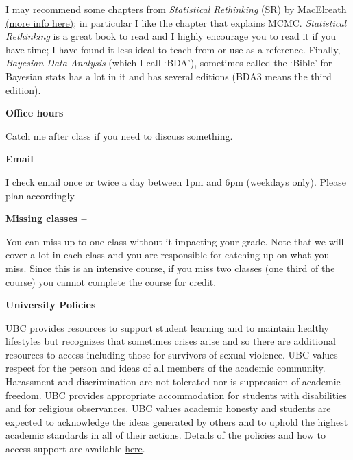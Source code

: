 \documentclass[11pt]{article}
\begin{document}
\noindent I may recommend some chapters from \emph{Statistical Rethinking} (SR) by MacElreath \href{http://xcelab.net/rm/statistical-rethinking/}{(more info here)}; in particular I like the chapter that explains MCMC. \emph{Statistical Rethinking} is a great book to read and I highly encourage you to read it if you have time; I have found it less ideal to teach from or use as a reference. Finally, \emph{Bayesian Data Analysis} (which I call `BDA'), sometimes called the `Bible' for Bayesian stats has a lot in it and has several editions (BDA3 means the third edition).  \\ %

\begin{large} 
{\raggedright \textbf{Office hours --}}
\end{large}
Catch me after class if you need to discuss something.\\

\begin{large} 
{\raggedright \textbf{Email --}}
\end{large}
I check email once or twice a day between 1pm and 6pm (weekdays only). Please plan accordingly.\\

\begin{large} 
{\raggedright \textbf{Missing classes --}}
\end{large}
You can miss up to one class without it impacting your grade. Note that we will cover a lot in each class and you are responsible for catching up on what you miss. Since this is an intensive course, if you miss two classes (one third of the course) you cannot complete the course for credit. \\

\begin{large} 
{\raggedright \textbf{University Policies --}}
\end{large}
UBC provides resources to support student learning and to maintain healthy lifestyles but recognizes that sometimes crises arise and so there are additional resources to access including those for survivors of sexual violence. UBC values respect for the person and ideas of all members of the academic community. Harassment and discrimination are not tolerated nor is suppression of academic freedom. UBC provides appropriate accommodation for students with disabilities and for religious observances. UBC values academic honesty and students are expected to acknowledge the ideas generated by others and to uphold the highest academic standards in all of their actions. Details of the policies and how to access support are available \href {https://senate.ubc.ca/vancouver/policies-resources-support-student-success/}{here}.\\
\end{document}
